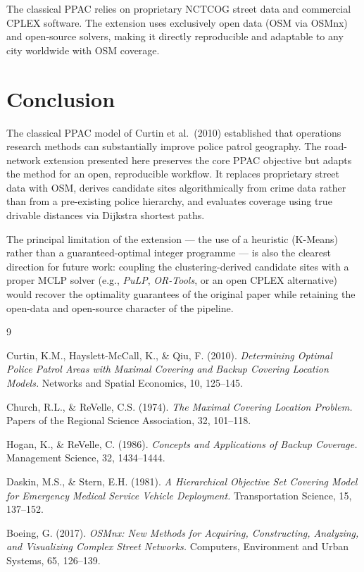 \documentclass[12pt]{article}
\begin{document}
The classical PPAC relies on proprietary NCTCOG street data and commercial
CPLEX software.  The extension uses exclusively open data (OSM via OSMnx) and
open-source solvers, making it directly reproducible and adaptable to any city
worldwide with OSM coverage.

\section{Conclusion}

The classical PPAC model of Curtin et al.\ (2010) established that operations
research methods can substantially improve police patrol geography.  The
road-network extension presented here preserves the core PPAC objective but
adapts the method for an open, reproducible workflow.  It replaces proprietary
street data with OSM, derives candidate sites algorithmically from crime data
rather than from a pre-existing police hierarchy, and evaluates coverage using
true drivable distances via Dijkstra shortest paths.

The principal limitation of the extension --- the use of a heuristic (K-Means)
rather than a guaranteed-optimal integer programme --- is also the clearest
direction for future work: coupling the clustering-derived candidate sites with
a proper MCLP solver (e.g., \textit{PuLP}, \textit{OR-Tools}, or an open
CPLEX alternative) would recover the optimality guarantees of the original
paper while retaining the open-data and open-source character of the pipeline.

\begin{thebibliography}{9}

Curtin, K.M., Hayslett-McCall, K., \& Qiu, F. (2010).
\textit{Determining Optimal Police Patrol Areas with Maximal Covering and
Backup Covering Location Models.}
Networks and Spatial Economics, 10, 125--145.

Church, R.L., \& ReVelle, C.S. (1974).
\textit{The Maximal Covering Location Problem.}
Papers of the Regional Science Association, 32, 101--118.

Hogan, K., \& ReVelle, C. (1986).
\textit{Concepts and Applications of Backup Coverage.}
Management Science, 32, 1434--1444.

Daskin, M.S., \& Stern, E.H. (1981).
\textit{A Hierarchical Objective Set Covering Model for Emergency Medical
Service Vehicle Deployment.}
Transportation Science, 15, 137--152.

Boeing, G. (2017).
\textit{OSMnx: New Methods for Acquiring, Constructing, Analyzing, and
Visualizing Complex Street Networks.}
Computers, Environment and Urban Systems, 65, 126--139.

\end{thebibliography}
\end{document}
